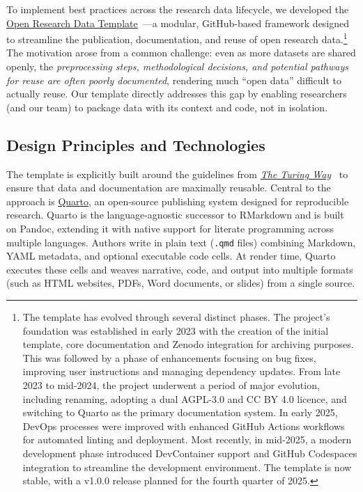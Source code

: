 \documentclass[final]{anthology-ch} %
\begin{document}
To implement best practices across the research data lifecycle, we developed the \href{https://github.com/maehr/open-research-data-template}{Open Research Data Template}~\cite{mahr2023g}---a modular, GitHub-based framework designed to streamline the publication, documentation, and reuse of open research data.\footnote{The template has evolved through several distinct phases. The project's foundation was established in early 2023 with the creation of the initial template, core documentation and Zenodo integration for archiving purposes. This was followed by a phase of enhancements focusing on bug fixes, improving user instructions and managing dependency updates. From late 2023 to mid-2024, the project underwent a period of major evolution, including renaming, adopting a dual AGPL-3.0 and CC BY 4.0 licence, and switching to Quarto as the primary documentation system. In early 2025, DevOps processes were improved with enhanced GitHub Actions workflows for automated linting and deployment. Most recently, in mid-2025, a modern development phase introduced DevContainer support and GitHub Codespaces integration to streamline the development environment. The template is now stable, with a v1.0.0 release planned for the fourth quarter of 2025.} The motivation arose from a common challenge: even as more datasets are shared openly, the \emph{preprocessing steps, methodological decisions, and potential pathways for reuse are often poorly documented}, rendering much ``open data'' difficult to actually reuse. Our template directly addresses this gap by enabling researchers (and our team) to package data with its context and code, not in isolation.

\subsection{Design Principles and Technologies}\label{design-principles-and-technologies}

The template is explicitly built around the guidelines from \href{https://book.the-turing-way.org/}{\emph{The Turing Way}}~\cite{theturingwaycommunity2025} to ensure that data and documentation are maximally reusable. Central to the approach is \href{https://quarto.org/}{Quarto}, an open-source publishing system designed for reproducible research. Quarto is the language-agnostic successor to RMarkdown and is built on Pandoc, extending it with native support for literate programming across multiple languages. Authors write in plain text (\texttt{.qmd} files) combining Markdown, YAML metadata, and optional executable code cells. At render time, Quarto executes these cells and weaves narrative, code, and output into multiple formats (such as HTML websites, PDFs, Word documents, or slides) from a single source.
\end{document}
